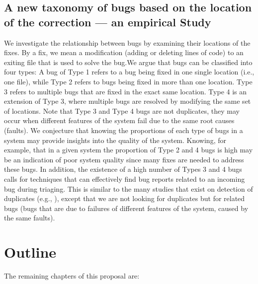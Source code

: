 \subsection{A new taxonomy of bugs based on the location of the correction --- an empirical Study}

We investigate the relationship between bugs by examining their locations of the fixes.
By a fix, we mean a modification (adding or deleting lines of code) to an exiting file that is used to solve the bug.We argue that bugs can be classified into four types:
A bug of Type 1 refers to a bug being fixed in one single location (i.e., one file), while Type 2 refers to bugs being fixed in more than one location.
Type 3 refers to multiple bugs that are fixed in the exact same location.
Type 4 is an extension of Type 3, where multiple bugs are resolved by modifying the same set of locations.
Note that Type 3 and Type 4 bugs are not duplicates, they may occur when different features of the system fail due to the same root causes (faults).
We conjecture that knowing the proportions of each type of bugs in a system may provide insights into the quality of the system.
Knowing, for example, that in a given system the proportion of Type 2 and 4 bugs is high may be an indication of poor system quality since many fixes are needed to address these bugs.
In addition, the existence of a high number of Types 3 and 4 bugs calls for techniques that can effectively find bug reports related to an incoming bug during triaging.
This is similar to the many studies that exist on detection of duplicates (e.g., \cite{Runeson2007, Sun2010,Nguyen2012}), except that we are not looking for duplicates but for related bugs (bugs that are due to failures of different features of the system, caused by the same faults).

\section{Outline\label{sec:outline}}

The remaining chapters of this proposal are:

